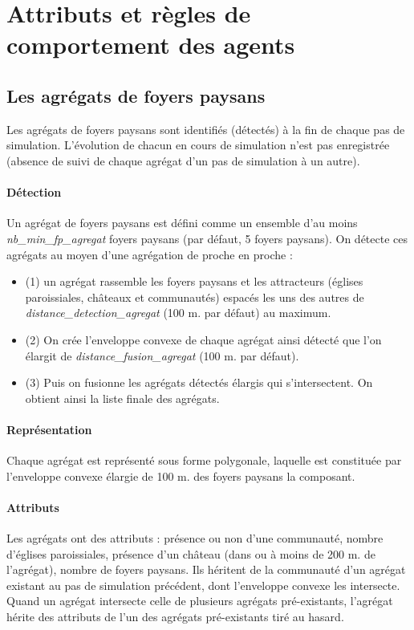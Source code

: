 \documentclass[a4paper,11pt]{article}
\begin{document}
\section[Attributs et règles]{Attributs et règles de comportement des agents}

\subsection{Les agrégats de foyers paysans}

Les agrégats de foyers paysans sont identifiés (détectés) à la fin de chaque pas de simulation. L'évolution de chacun en cours de simulation n'est pas enregistrée (absence de suivi de chaque agrégat d'un pas de simulation à un autre).

\paragraph{Détection}
Un agrégat de foyers paysans est défini comme un ensemble d'au moins \textit{nb\_min\_fp\_agregat} foyers paysans (par défaut, 5 foyers paysans). On détecte ces agrégats au moyen d'une agrégation de proche en proche :
\begin{itemize}
  \item (1) un agrégat rassemble les foyers paysans et les attracteurs (églises paroissiales, châteaux et communautés) espacés les uns des autres de \textit{distance\_detection\_agregat} (100 m. par défaut) au maximum.
  \item (2) On crée l'enveloppe convexe de chaque agrégat ainsi détecté que l'on élargit de \textit{distance\_fusion\_agregat} (100 m. par défaut).
  \item (3) Puis on fusionne les agrégats détectés élargis qui s'intersectent. On obtient ainsi la liste finale des agrégats.
\end{itemize}

\paragraph{Représentation}
Chaque agrégat est représenté sous forme polygonale, laquelle est constituée par l'enveloppe convexe élargie de 100 m. des foyers paysans la composant.

\paragraph{Attributs}
Les agrégats ont des attributs : présence ou non d'une communauté, nombre d'églises paroissiales, présence d'un château (dans ou à moins de 200 m. de l'agrégat), nombre de foyers paysans. Ils héritent de la communauté d'un agrégat existant au pas de simulation précédent, dont l'enveloppe convexe les intersecte. Quand un agrégat intersecte celle de plusieurs agrégats pré-existants, l'agrégat hérite des attributs de l'un des agrégats pré-existants tiré au hasard.
\end{document}
